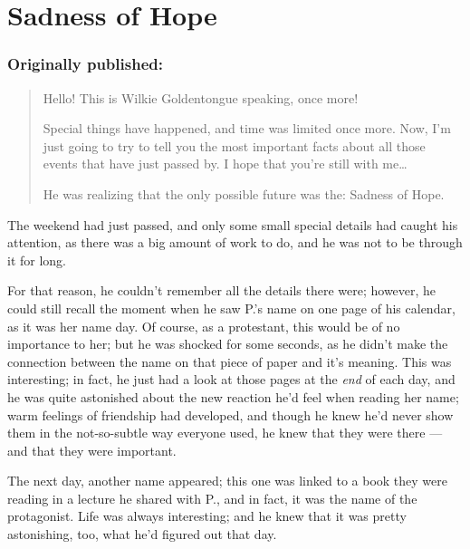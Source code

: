 \chapter{Sadness of Hope}
\label{cha:sadness-of-hope}
\subsection*{Originally published: }
\begin{quote}
Hello! This is Wilkie Goldentongue speaking, once more!

Special things have happened, and time was limited once more. Now, I'm just going to try to tell you the most important facts about all those events that have just passed by. I hope that you're still with me\dots{}

He was realizing that the only possible future was the: Sadness of Hope.
\end{quote}

The weekend had just passed, and only some small special details had caught his attention, as there was a big amount of work to do, and he was not to be through it for long.

For that reason, he couldn't remember all the details there were; however, he could still recall the moment when he saw P.'s name on one page of his calendar, as it was her name day. Of course, as a protestant, this would be of no importance to her; but he was shocked for some seconds, as he didn't make the connection between the name on that piece of paper and it's meaning. This was interesting; in fact, he just had a look at those pages at the \emph{end} of each day, and he was quite astonished about the new reaction he'd feel when reading her name; warm feelings of friendship had developed, and though he knew he'd never show them in the not-so-subtle way everyone used, he knew that they were there --- and that they were important.

The next day, another name appeared; this one was linked to a book they were reading in a lecture he shared with P., and in fact, it was the name of the protagonist. 
Life was always interesting; and he knew that it was pretty astonishing, too, what he'd figured out that day.

